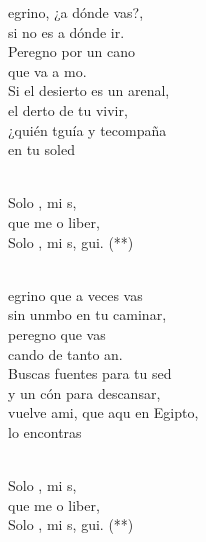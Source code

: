 \documentclass[12pt]{article}
\begin{document}
\begin{multicols*}{2}
\begin{cancion}%
	egrino, ¿a dónde vas?, \\
	si no es a dónde ir.\\
	Peregno por un cano \\
	que va a mo. \\
Si el desierto es un arenal, \\
	el derto de tu vivir,\\
	¿quién tguía y tecompaña \\
	en tu soled  \\\jump\\
	\begin{chorus}%
	Solo , mi s,\\
	que me o liber,\\
	Solo , mi s, gui. (**) \\
	\end{chorus}%
	\jump\\
	egrino que a veces vas \\
	sin unmbo en tu caminar,\\
	peregno que vas \\
	cando de tanto an. \\
Buscas fuentes para tu sed \\
	y un cón para descansar,\\
	vuelve ami, que aqu en Egipto, \\
	lo encontras \\\jump\\
	\begin{chorus}%
	Solo , mi s,\\
	que me o liber,\\
	Solo , mi s, gui. (**) \\
	\end{chorus}%

\end{cancion}
\end{multicols*}
\end{document}
